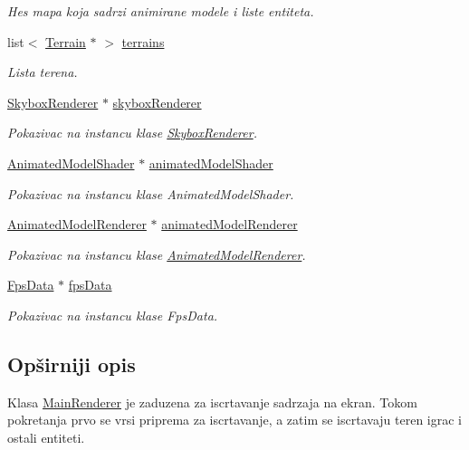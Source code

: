 \begin{DoxyCompactItemize}
\begin{DoxyCompactList}\small\item\em Hes mapa koja sadrzi animirane modele i liste entiteta. \end{DoxyCompactList}\item 
list$<$ \hyperlink{classterrain_1_1Terrain}{Terrain} $\ast$ $>$ \hyperlink{classcore_1_1MainRenderer_ada8a51626222137e00ae29445e28f892}{terrains}
\begin{DoxyCompactList}\small\item\em Lista terena. \end{DoxyCompactList}\item 
\hyperlink{classcore_1_1SkyboxRenderer}{Skybox\+Renderer} $\ast$ \hyperlink{classcore_1_1MainRenderer_a2e02e2528a233d92ed37587fa2ba38a4}{skybox\+Renderer}
\begin{DoxyCompactList}\small\item\em Pokazivac na instancu klase \hyperlink{classcore_1_1SkyboxRenderer}{Skybox\+Renderer}. \end{DoxyCompactList}\item 
\hyperlink{classshader_1_1AnimatedModelShader}{Animated\+Model\+Shader} $\ast$ \hyperlink{classcore_1_1MainRenderer_a877b54b83993c0b0550f5ec5517330cc}{animated\+Model\+Shader}
\begin{DoxyCompactList}\small\item\em Pokazivac na instancu klase Animated\+Model\+Shader. \end{DoxyCompactList}\item 
\hyperlink{classcore_1_1AnimatedModelRenderer}{Animated\+Model\+Renderer} $\ast$ \hyperlink{classcore_1_1MainRenderer_a90bd7e1f715fd09726103eb412b6149e}{animated\+Model\+Renderer}
\begin{DoxyCompactList}\small\item\em Pokazivac na instancu klase \hyperlink{classcore_1_1AnimatedModelRenderer}{Animated\+Model\+Renderer}. \end{DoxyCompactList}\item 
\hyperlink{classutility_1_1FpsData}{Fps\+Data} $\ast$ \hyperlink{classcore_1_1MainRenderer_a0ea0659ecfb85286fb5f2bb1d8dc1be1}{fps\+Data}
\begin{DoxyCompactList}\small\item\em Pokazivac na instancu klase Fps\+Data. \end{DoxyCompactList}\end{DoxyCompactItemize}


\subsection{Opširniji opis}
Klasa \hyperlink{classcore_1_1MainRenderer}{Main\+Renderer} je zaduzena za iscrtavanje sadrzaja na ekran. Tokom pokretanja prvo se vrsi priprema za iscrtavanje, a zatim se iscrtavaju teren igrac i ostali entiteti. 


